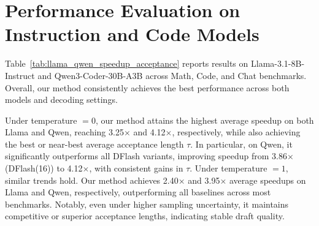 \documentclass{article}
\begin{document}




\section{Performance Evaluation on Instruction and Code Models}
\label{app:main}
Table~\ref{tab:llama_qwen_speedup_acceptance} reports results on Llama-3.1-8B-Instruct and Qwen3-Coder-30B-A3B across Math, Code, and Chat benchmarks. Overall, our method consistently achieves the best performance across both models and decoding settings.

Under temperature $=0$, our method attains the highest average speedup on both Llama and Qwen, reaching 3.25$\times$ and 4.12$\times$, respectively, while also achieving the best or near-best average acceptance length $\tau$. In particular, on Qwen, it significantly outperforms all DFlash variants, improving speedup from 3.86$\times$ (DFlash(16)) to 4.12$\times$, with consistent gains in $\tau$. Under temperature $=1$, similar trends hold. Our method achieves 2.40$\times$ and 3.95$\times$ average speedups on Llama and Qwen, respectively, outperforming all baselines across most benchmarks. Notably, even under higher sampling uncertainty, it maintains competitive or superior acceptance lengths, indicating stable draft quality.
\end{document}
